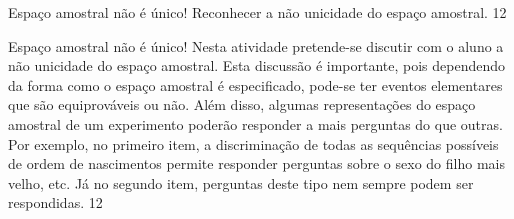 \clearpage
\def\currentcolor{session2}
\begin{objectives}{Espaço amostral não é único!}
{
Reconhecer a não unicidade do espaço amostral.
}{1}{2}
\end{objectives}
\begin{sugestions}{Espaço amostral não é único!}
{
Nesta atividade pretende-se discutir com o aluno a não unicidade do espaço amostral. Esta discussão é importante, pois dependendo da forma como o espaço amostral é especificado, pode-se ter eventos elementares que são equiprováveis ou não. Além disso, algumas representações do espaço amostral de um experimento poderão responder a mais perguntas do que outras. Por exemplo, no primeiro item, a discriminação de todas as sequências possíveis de ordem de nascimentos permite responder perguntas sobre o sexo do filho mais velho, etc. Já no segundo item, perguntas deste tipo nem sempre podem ser respondidas.
}{1}{2}
\end{sugestions}
